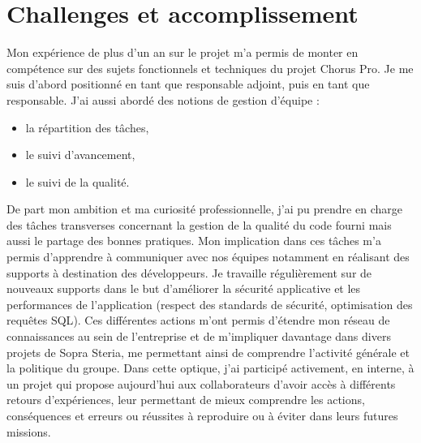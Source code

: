 \documentclass[12pt,a4paper]{article}
\begin{document}
\section{Challenges et accomplissement}
Mon expérience de plus d'un an sur le projet m'a permis de monter en compétence sur des sujets fonctionnels et techniques du projet Chorus Pro. Je me suis d'abord positionné en tant que responsable adjoint, puis en tant que responsable. J'ai aussi abordé des notions de gestion d'équipe :
\smallbreak
\begin{itemize}
\item la répartition des tâches,
\item le suivi d'avancement,
\item le suivi de la qualité.
\end{itemize}
\medbreak
De part mon ambition et ma curiosité professionnelle, j'ai pu prendre en charge des tâches transverses concernant la gestion de la qualité du code fourni mais aussi le partage des bonnes pratiques.
\smallbreak
Mon implication dans ces tâches m'a permis d'apprendre à communiquer avec nos équipes notamment en réalisant des supports à destination des développeurs. Je travaille régulièrement sur de nouveaux supports dans le but d'améliorer la sécurité applicative et les performances de l'application (respect des standards de sécurité, optimisation des requêtes \gls{SQL}).
\medbreak
Ces différentes actions m'ont permis d'étendre mon réseau de connaissances au sein de l'entreprise et de m'impliquer davantage dans divers projets de Sopra Steria, me permettant ainsi de comprendre l'activité générale et la politique du groupe. Dans cette optique, j'ai participé activement, en interne, à un projet qui propose aujourd'hui aux collaborateurs d'avoir accès à différents retours d'expériences, leur permettant de mieux comprendre les actions, conséquences et erreurs ou réussites à reproduire ou à éviter dans leurs futures missions.
\newpage
\end{document}
